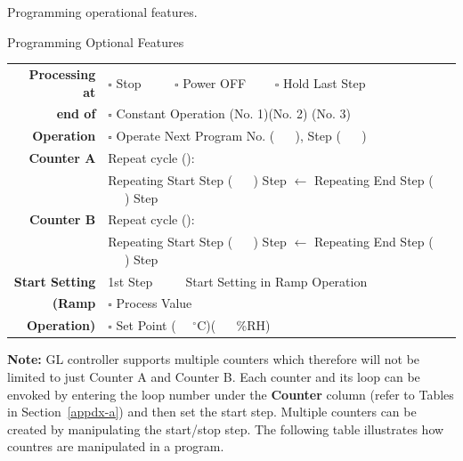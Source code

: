 Programming operational features. 

\begin{table2}[label={mynamelabel},nameref={Title}]{Programming Optional Features} {\label{tab:sample-prog-05}}
   {%
     \begin{tabular}{r | l }
       \hline
       {\bf{Processing at}} & $\square$ Stop $\qquad$ $\square$ Power OFF  $\qquad \square$ Hold Last Step\\ 
       {\bf{end of}}   & $\square$ Constant Operation (No. 1)(No. 2) (No. 3) \\ 
       {\bf{Operation}} &  $\square$ Operate Next Program No. ( $\quad$ ), Step  ( $\quad$ ) \\ \hline 
       {\bf{Counter A}} & Repeat cycle (): \\
                        & Repeating Start Step ( $\quad$ ) Step $\longleftarrow$ Repeating End Step ( $\quad$ ) Step \\ \hline 
       {\bf{Counter B}} & Repeat cycle (): \\ 
                     & Repeating Start Step ( $\quad$ ) Step $\longleftarrow$ Repeating End Step ( $\quad$ ) Step \\ \hline 
      {\bf{Start Setting}}  & 1st Step $\qquad$ Start Setting in Ramp Operation \\
      {\bf{(Ramp}}  & $\square$ Process Value  \\  
      {\bf{Operation)}} & $\square$ Set Point ( $\quad {}^{\circ}$C)( $\quad$ \%RH) \\  
       \hline 
       \end{tabular}
   }
   \end{table2}

   {\bf{Note:}} GL controller supports multiple counters which therefore will not be limited to just Counter A and Counter B. Each counter and its loop can be envoked by entering the loop number under the {\bf{Counter}} column (refer to Tables in Section~\ref{appdx-a}) and then set the start step. Multiple counters can be created by manipulating the start/stop step. The following table illustrates how countres are manipulated in a program.   

